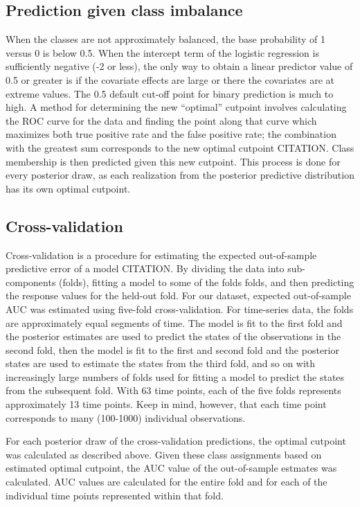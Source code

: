 \documentclass[12pt,letterpaper]{article}
\begin{document}
\subsection{Prediction given class imbalance}

When the classes are not approximately balanced, the base probability of 1 versus 0 is below 0.5. When the intercept term of the logistic regression is sufficiently negative (-2 or less), the only way to obtain a linear predictor value of 0.5 or greater is if the covariate effects are large or there the covariates are at extreme values. The 0.5 default cut-off point for binary prediction is much to high. A method for determining the new ``optimal'' cutpoint involves calculating the ROC curve for the data and finding the point along that curve which maximizes both true positive rate and the false positive rate; the combination with the greatest sum corresponds to the new optimal cutpoint CITATION. Class membership is then predicted given this new cutpoint. This process is done for every posterior draw, as each realization from the posterior predictive distribution has its own optimal cutpoint.


\subsection{Cross-validation}

Cross-validation is a procedure for estimating the expected out-of-sample predictive error of a model CITATION. By dividing the data into sub-components (folds), fitting a model to some of the folds folds, and then predicting the response values for the held-out fold. For our dataset, expected out-of-sample AUC was estimated using five-fold cross-validation. For time-series data, the folds are approximately equal segments of time. The model is fit to the first fold and the posterior estimates are used to predict the states of the observations in the second fold, then the model is fit to the first and second fold and the posterior states are used to estimate the states from the third fold, and so on with increasingly large numbers of folds used for fitting a model to predict the states from the subsequent fold. With 63 time points, each of the five folds represents approximately 13 time points. Keep in mind, however, that each time point corresponds to many (100-1000) individual observations.

For each posterior draw of the cross-validation predictions, the optimal cutpoint was calculated as described above. Given these class assignments based on estimated optimal cutpoint, the AUC value of the out-of-sample estmates was calculated. AUC values are calculated for the entire fold and for each of the individual time points represented within that fold.
\end{document}
